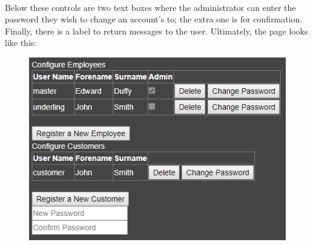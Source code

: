 ﻿\documentclass{article}
\begin{document}
    \paragraph{}
    Below these controls are two text boxes where the administrator can enter the password they wish to change an account's to; the extra one is for confirmation.
    Finally, there is a label to return messages to the user.
    Ultimately, the page looks like this:
    \begin{figure}[H]
        \includegraphics{userConfigPage.png}
        \centering
    \end{figure}
\end{document}
